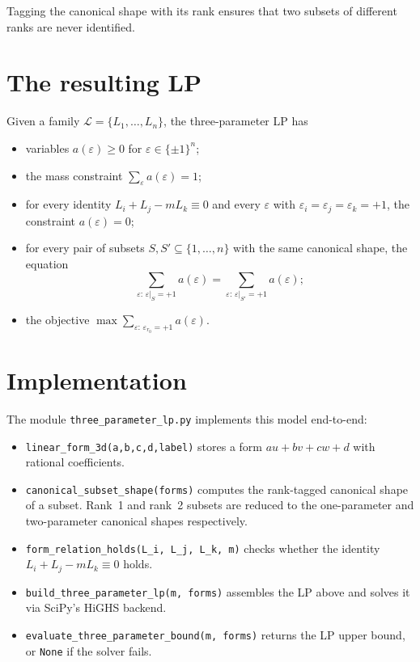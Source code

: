 \documentclass[11pt]{article}
\begin{document}
Tagging the canonical shape with its rank ensures that two subsets of different
ranks are never identified.

\section{The resulting LP}

Given a family $\mathcal{L}=\{L_1,\dots,L_n\}$, the three-parameter LP has

\begin{itemize}
\item variables $a(\varepsilon)\ge 0$ for $\varepsilon\in\{\pm 1\}^n$;
\item the mass constraint $\sum_\varepsilon a(\varepsilon)=1$;
\item for every identity $L_i+L_j-mL_k\equiv 0$ and every $\varepsilon$ with
$\varepsilon_i=\varepsilon_j=\varepsilon_k=+1$, the constraint
$a(\varepsilon)=0$;
\item for every pair of subsets $S,S'\subseteq\{1,\dots,n\}$ with the same
canonical shape, the equation
\[
\sum_{\varepsilon:\,\varepsilon|_S=+1}a(\varepsilon)
=
\sum_{\varepsilon:\,\varepsilon|_{S'}=+1}a(\varepsilon);
\]
\item the objective $\max\sum_{\varepsilon:\,\varepsilon_{r_0}=+1}a(\varepsilon)$.
\end{itemize}

\section{Implementation}

The module \texttt{three\_parameter\_lp.py} implements this model end-to-end:

\begin{itemize}
\item \texttt{linear\_form\_3d(a,b,c,d,label)} stores a form $au+bv+cw+d$ with
rational coefficients.
\item \texttt{canonical\_subset\_shape(forms)} computes the rank-tagged canonical
shape of a subset. Rank~1 and rank~2 subsets are reduced to the
one-parameter and two-parameter canonical shapes respectively.
\item \texttt{form\_relation\_holds(L\_i, L\_j, L\_k, m)} checks whether the
identity $L_i+L_j-mL_k\equiv 0$ holds.
\item \texttt{build\_three\_parameter\_lp(m, forms)} assembles the LP above and
solves it via SciPy's HiGHS backend.
\item \texttt{evaluate\_three\_parameter\_bound(m, forms)} returns the LP upper
bound, or \texttt{None} if the solver fails.
\end{itemize}
\end{document}
